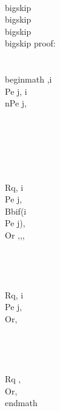 \\bigskip
\\bigskip
\\bigskip
\\bigskip
proof:\\\\
\\begin{math} 
,i \\Pe j, i \\nPe j,\\\\\\\\\\\\
\\Rq, i \\Pe j,\\Bb{if(i \\Pe j)}{, \\Or ,}{,}, \\\\\\\\
\\Rq, i \\Pe j, \\Or, \\\\\\\\
\\Rq , \\Or,
\\end{math}



\\[,i \\nPe j, i \\Pe j, \\Rq , \\Or,\\]

